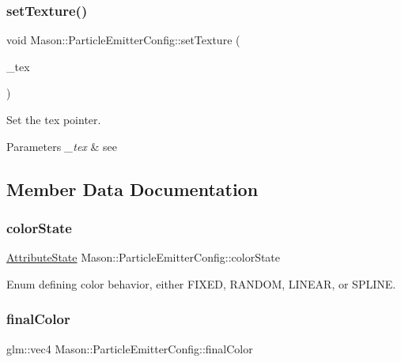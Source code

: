 \subsubsection{\texorpdfstring{set\+Texture()}{setTexture()}}
{\footnotesize\ttfamily void Mason\+::\+Particle\+Emitter\+Config\+::set\+Texture (\begin{DoxyParamCaption}\item[{S\+R\+E\+::\+Texture $\ast$}]{\+\_\+tex }\end{DoxyParamCaption})\hspace{0.3cm}{\ttfamily [inline]}}



Set the tex pointer. 


\begin{DoxyParams}{Parameters}
{\em \+\_\+tex} & see  \\
\hline
\end{DoxyParams}


\subsection{Member Data Documentation}
\hypertarget{struct_mason_1_1_particle_emitter_config_a94ad732500966a699dcead307033269a}{}\label{struct_mason_1_1_particle_emitter_config_a94ad732500966a699dcead307033269a} 
\subsubsection{\texorpdfstring{color\+State}{colorState}}
{\footnotesize\ttfamily \hyperlink{namespace_mason_aefc2ce7d9295b57af46ab6c8ebfc32f7}{Attribute\+State} Mason\+::\+Particle\+Emitter\+Config\+::color\+State}



Enum defining color behavior, either F\+I\+X\+ED, R\+A\+N\+D\+OM, L\+I\+N\+E\+AR, or S\+P\+L\+I\+NE. 

\hypertarget{struct_mason_1_1_particle_emitter_config_addf94f6df6c784495840b93aa30ce162}{}\label{struct_mason_1_1_particle_emitter_config_addf94f6df6c784495840b93aa30ce162} 
\subsubsection{\texorpdfstring{final\+Color}{finalColor}}
{\footnotesize\ttfamily glm\+::vec4 Mason\+::\+Particle\+Emitter\+Config\+::final\+Color}



